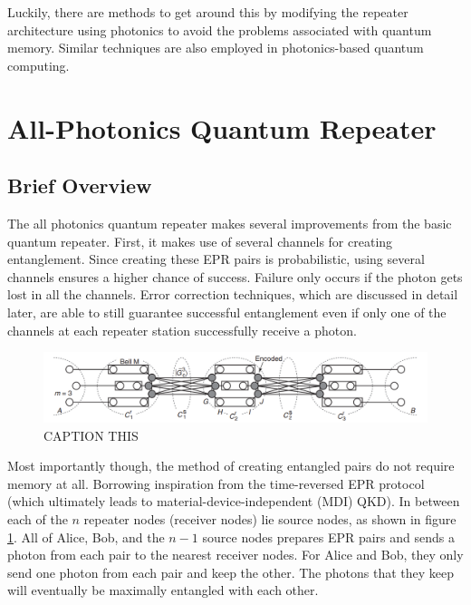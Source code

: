 \documentclass[%
 reprint,
 amsmath,amssymb
 aps,
]{revtex4}
\theoremstyle{remark}
\begin{document}
Luckily, there are methods to get around this by modifying the repeater architecture using photonics to avoid the problems associated with quantum memory. Similar techniques are also employed in photonics-based quantum computing.
\section{All-Photonics Quantum Repeater}
\subsection{Brief Overview}
The all photonics quantum repeater makes several improvements from the basic quantum repeater. First, it makes use of several channels for creating entanglement. Since creating these EPR pairs is probabilistic, using several channels ensures a higher chance of success. Failure only occurs if the photon gets lost in all the channels. Error correction techniques, which are discussed in detail later, are able to still guarantee successful entanglement even if only one of the channels at each repeater station successfully receive a photon.
\begin{figure}[h!]
    \centering
    \includegraphics[width=0.8\linewidth]{figs/photonics.png}
    \caption{CAPTION THIS}
    \label{fig:photonics}
\end{figure}
Most importantly though, the method of creating entangled pairs do not require memory at all. Borrowing inspiration from the time-reversed EPR protocol (which ultimately leads to material-device-independent (MDI) QKD). In between each of the $n$ repeater nodes (receiver nodes) lie source nodes, as shown in figure \ref{fig:photonics}. All of Alice, Bob, and the $n-1$ source nodes prepares EPR pairs and sends a photon from each pair to the nearest receiver nodes. For Alice and Bob, they only send one photon from each pair and keep the other. The photons that they keep will eventually be maximally entangled with each other. 
\end{document}
